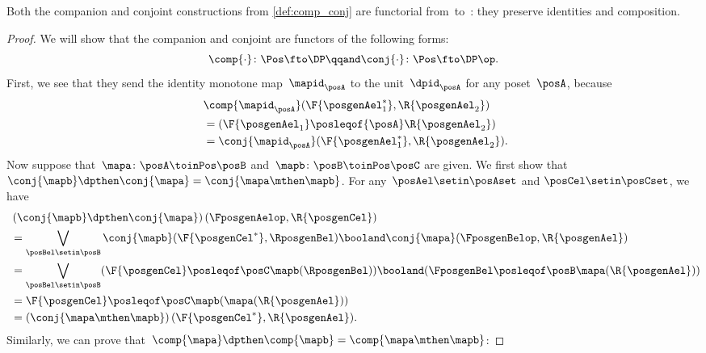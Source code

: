 \begin{lemma}
    \label{lem:comp_conj}
    Both the companion and conjoint constructions from \cref{def:comp_conj} are functorial from~\Pos to~\DP: they preserve identities and composition.
\end{lemma}
\begin{proof}
    We will show that the companion and conjoint are functors of the following forms:
    \begin{equation}
        \comp{\cdot}\colon\Pos\fto\DP
        \qqand
        \conj{\cdot}\colon\Pos\fto\DP\op.
    \end{equation}
    First, we see that they send the identity monotone map~$\mapid_{\posA}$ to the unit~$\dpid_{\posA}$ for any poset~$\posA$, because
    \begin{equation}
        \begin{aligned}
            ~ & \comp{\mapid_{\posA}}(\F{\posgenAel_1^*},\R{\posgenAel_2}) \\
              & = (\F{\posgenAel_1} \posleqof{\posA} \R{\posgenAel_2}) \\
              & =\conj{\mapid_{\posA}}(\F{\posgenAel_1^*},\R{\posgenAel_2}).
        \end{aligned}
    \end{equation}
    Now suppose that~$\mapa\colon  \posA \toinPos \posB $ and~$\mapb\colon \posB \toinPos \posC$ are given.
    We first show that $\conj{\mapb}\dpthen\conj{\mapa}=\conj{\mapa\mthen \mapb}$.
    For any~$\posAel\setin \posAset$ and $\posCel\setin \posCset$, we have
    \begin{equation}
        \begin{aligned}
            ~ & \left(\conj{\mapb}\dpthen \conj{\mapa}\right)(\FposgenAelop,\R{\posgenCel}) \\
              & =\bigvee_{\posBel\setin \posB} \conj{\mapb}(\F{\posgenCel^*},\RposgenBel)\booland\conj{\mapa}(\FposgenBelop,\R{\posgenAel}) \\
              & =\bigvee_{\posBel\setin \posB} (\F{\posgenCel}\posleqof\posC \mapb(\RposgenBel)) \booland (\FposgenBel\posleqof\posB \mapa(\R{\posgenAel})) \\
              & = \F{\posgenCel}\posleqof\posC \mapb(\mapa(\R{\posgenAel})) \\
              & =\left(\conj{\mapa\mthen \mapb}\right)(\F{\posgenCel^*},\R{\posgenAel}).
        \end{aligned}
    \end{equation}
    Similarly, we can prove that~$\comp{\mapa}\dpthen \comp{\mapb}=\comp{\mapa\mthen \mapb}$:

\end{proof}
